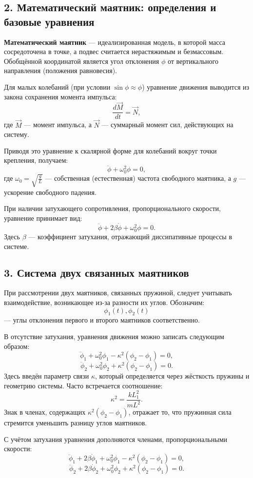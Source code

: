 \documentclass[a4paper,11pt]{article}
\theoremstyle{definition}
\begin{document}
\subsection*{2. Математический маятник: определения и базовые уравнения}
\textbf{Математический маятник} --- идеализированная модель, в которой масса сосредоточена в точке, а подвес 
считается нерастяжимым и безмассовым. Обобщённой координатой является угол отклонения \(\phi\) от вертикального 
направления (положения равновесия).

Для малых колебаний (при условии \(\sin \phi \approx \phi\)) уравнение движения выводится из закона 
сохранения момента импульса:
\[
\frac{d\vec{M}}{dt} = \vec{N},
\]
где \(\vec{M}\) --- момент импульса, а \(\vec{N}\) --- суммарный момент сил, действующих на систему.

Приводя это уравнение к скалярной форме для колебаний вокруг точки крепления, получаем:
\[
\ddot{\phi} + \omega_0^2 \phi = 0,
\]
где \(\omega_0 = \sqrt{\frac{g}{L}}\) --- собственная (естественная) частота свободного маятника, 
а \(g\) --- ускорение свободного падения.

При наличии затухающего сопротивления, пропорционального скорости, уравнение принимает вид:
\[
\ddot{\phi} + 2\beta\dot{\phi} + \omega_0^2 \phi = 0.
\]
Здесь \(\beta\) --- коэффициент затухания, отражающий диссипативные процессы в системе.



\subsection*{3. Система двух связанных маятников}
При рассмотрении двух маятников, связанных пружиной, следует учитывать взаимодействие, возникающее 
из-за разности их углов. Обозначим:
\[
\phi_1(t), \phi_2(t)
\]
--- углы отклонения первого и второго маятников соответственно.

В отсутствие затухания, уравнения движения можно записать следующим образом:
\[
\ddot{\phi}_1 + \omega_0^2 \phi_1 - \kappa^2 (\phi_2 - \phi_1) = 0,
\]
\[
\ddot{\phi}_2 + \omega_0^2 \phi_2 + \kappa^2 (\phi_2 - \phi_1) = 0.
\]
Здесь введён параметр связи \(\kappa\), который определяется через жёсткость пружины и геометрию 
системы. Часто встречается соотношение:
\[
\kappa^2 = \frac{k L_1^2}{mL^2}.
\]
Знак в членах, содержащих \(\kappa^2(\phi_2 - \phi_1)\), отражает то, что пружинная сила стремится 
уменьшить разницу углов маятников.

С учётом затухания уравнения дополняются членами, пропорциональными скорости:
\[
\ddot{\phi}_1 + 2\beta\dot{\phi}_1 + \omega_0^2 \phi_1 - \kappa^2 (\phi_2 - \phi_1) = 0,
\]
\[
\ddot{\phi}_2 + 2\beta\dot{\phi}_2 + \omega_0^2 \phi_2 + \kappa^2 (\phi_2 - \phi_1) = 0.
\]
\end{document}

